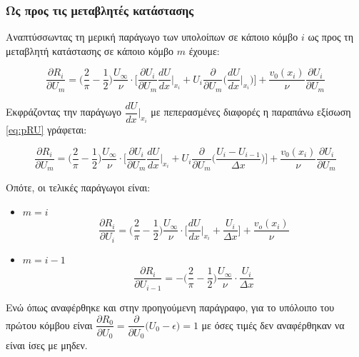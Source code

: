 \subsubsection{Ως προς τις μεταβλητές κατάστασης}
 
Αναπτύσσωντας τη μερική παράγωγο των υπολοίπων σε κάποιο κόμβο $i$ ως προς τη μεταβλητή κατάστασης σε κάποιο κόμβο $m$ έχουμε:

\begin{equation}
    \dfrac{\partial R_i}{\partial U_m} = \Big(\dfrac{2}{\pi}-\dfrac{1}{2}\Big)\dfrac{U_{\infty}}{\nu}\cdot \Bigg[\dfrac{\partial U_i}{\partial U_m} \dfrac{dU}{dx}\Bigg|_{x_i} + U_i\dfrac{\partial}{\partial U_m}\Big(\dfrac{dU}{dx}\Big|_{x_i}\Big)\Bigg]  + \dfrac{v_0(x_i)}{\nu}\dfrac{\partial U_i}{\partial U_m}
    \label{eq:pRU}
\end{equation}

Εκφράζοντας την παράγωγο $\dfrac{dU}{dx}\Big|_{x_i}$ με πεπερασμένες διαφορές η παραπάνω εξίσωση \ref{eq:pRU} γράφεται:

\begin{equation}
    \dfrac{\partial R_i}{\partial U_m} = \Big(\dfrac{2}{\pi}-\dfrac{1}{2}\Big)\dfrac{U_{\infty}}{\nu}\cdot \Bigg[\dfrac{\partial U_i}{\partial U_m} \dfrac{dU}{dx}\Bigg|_{x_i} + U_i\dfrac{\partial}{\partial U_m}\Big(\dfrac{U_{i}-U_{i-1}}{\Delta x}\Big)\Bigg]  + \dfrac{v_0(x_i)}{\nu}\dfrac{\partial U_i}{\partial U_m}
    \label{eq:pRUfinal}
\end{equation}

Οπότε, οι τελικές παράγωγοι είναι:

\begin{itemize}
    \item $m=i$\\ $$ \dfrac{\partial R_i}{\partial U_i} =  \Big(\dfrac{2}{\pi}-\dfrac{1}{2}\Big)\dfrac{U_{\infty}}{\nu} \cdot \Bigg[\dfrac{dU}{dx}\Bigg|_{x_i} + \dfrac{U_i}{\Delta x}\Bigg] + \dfrac{v_o(x_i)}{\nu}$$ 
    \item $m = i-1$\\ $$\dfrac{\partial R_i}{\partial U_{i-1}} = - \Big(\dfrac{2}{\pi}-\dfrac{1}{2}\Big)\dfrac{U_{\infty}}{\nu} \cdot\dfrac{U_i}{\Delta x} $$ 
\end{itemize}

Ενώ όπως αναφέρθηκε και στην προηγούμενη παράγραφο, για το υπόλοιπο του πρώτου κόμβου είναι $\dfrac{\partial R_0}{\partial U_0} = \dfrac{\partial}{\partial U_0} \Big( U_0 -\epsilon \Big) = 1$ με όσες τιμές δεν αναφέρθηκαν να είναι ίσες με μηδεν.

